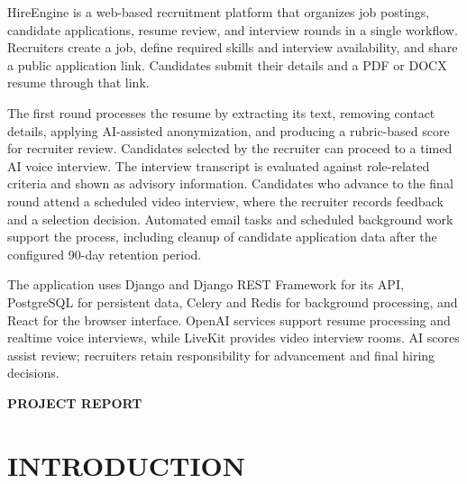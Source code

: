 HireEngine is a web-based recruitment platform that organizes job postings, candidate applications, resume review, and interview rounds in a single workflow. Recruiters create a job, define required skills and interview availability, and share a public application link. Candidates submit their details and a PDF or DOCX resume through that link.

The first round processes the resume by extracting its text, removing contact details, applying AI-assisted anonymization, and producing a rubric-based score for recruiter review. Candidates selected by the recruiter can proceed to a timed AI voice interview. The interview transcript is evaluated against role-related criteria and shown as advisory information. Candidates who advance to the final round attend a scheduled video interview, where the recruiter records feedback and a selection decision. Automated email tasks and scheduled background work support the process, including cleanup of candidate application data after the configured 90-day retention period.

The application uses Django and Django REST Framework for its API, PostgreSQL for persistent data, Celery and Redis for background processing, and React for the browser interface. OpenAI services support resume processing and realtime voice interviews, while LiveKit provides video interview rooms. AI scores assist review; recruiters retain responsibility for advancement and final hiring decisions.
%
%
%
\clearpage
{}
\tableofcontents
%
%
\clearpage
{}
\listoftables
%
%
\clearpage
{}
\listoffigures
%
%
\mainmatter
%
\clearpage
\quad\vfill
\begin{center}
{\Huge \bf PROJECT REPORT}
\end{center}
\vfill
\clearpage
%
%
% 
%
%
%  
\chapter{INTRODUCTION}

